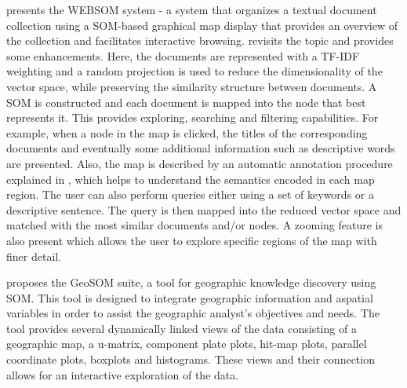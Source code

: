 \documentclass[a4paper]{article}
\begin{document}
\citet{kaski1998} presents the WEBSOM system - a system that organizes a textual document collection using a SOM-based graphical
map display that provides an overview of the collection and facilitates interactive browsing. \citet{kohonen2013} revisits the topic and provides some enhancements. Here, the documents are represented with a TF-IDF weighting \citep{jones1972} and a random projection is used to reduce the dimensionality of the vector space, while preserving the similarity structure between documents. A SOM is constructed and each document is mapped into the node that best represents it. This provides exploring, searching and filtering capabilities. For example, when a node in the map is clicked, the titles of the corresponding documents and eventually some additional information such as descriptive words are presented. Also, the map is described by an automatic annotation procedure explained in \citet{lagus1999}, which helps to understand the semantics encoded in each map region. The user can also perform queries either using a set of keywords or a descriptive sentence. The query is then mapped into the reduced vector space and matched with the most similar documents and/or nodes. A zooming feature is also present which allows the user to explore specific regions of the map with finer detail.

\citet{henriques2012} proposes the GeoSOM suite, a tool for geographic knowledge discovery using SOM. This tool is designed to integrate geographic information and aspatial variables in order to assist the geographic analyst's objectives and needs. The tool provides several dynamically linked views of the data consisting of a geographic map, a u-matrix, component plate plots, hit-map plots, parallel coordinate plots, boxplots and histograms. These views and their connection allows for an interactive exploration of the data.
\end{document}

